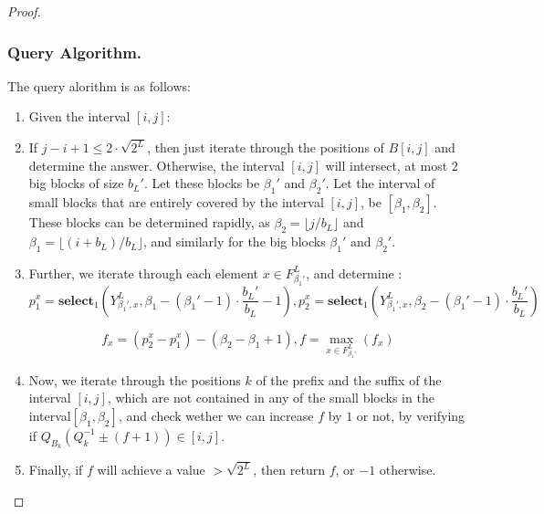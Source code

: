 \documentclass[runningheads]{llncs}
\begin{document}
\begin{proof}
    \subsubsection{Query Algorithm.} The query alorithm is as follows:

        \begin{enumerate}
            \item[] Given the interval $[i,j]$:
            
            \item If $j-i+1\leq 2\cdot \sqrt{2^L}$, then just iterate through the positions of $B[i,j]$ and determine the answer. 
            Otherwise, the interval $[i,j]$ will intersect, at most $2$ big blocks of size $b_L'$. Let these blocks be $\beta_1'$ and $\beta_2'$. 
            Let the interval of small blocks that are entirely covered by the interval $[i,j]$, be $[\beta_1, \beta_2]$. 
            These blocks can be determined rapidly, as $\beta_2=\lfloor j/b_L \rfloor$ and $\beta_1=\lfloor (i+b_L)/b_L \rfloor$, and similarly 
            for the big blocks $\beta_1'$ and $\beta_2'$.
            
            \item Further, we iterate through each element $x\in F_{\beta_1'}^L$, and determine :
            \[
                p_1^x = \textbf{select}_1( Y_{\beta_1',x}^L, \beta_1-(\beta_1'-1)\cdot \frac{b_L'}{b_L}-1 ) , 
                p_2^x = \textbf{select}_1( Y_{\beta_1',x}^L, \beta_2-(\beta_1'-1)\cdot \frac{b_L'}{b_L} ) 
            \]

            \[
                f_x=(p^x_2-p^x_1)-(\beta_2-\beta_1+1), f=\max_{x \in F_{\beta_1'}^L }( f_x )
            \]  
            
            \item Now, we iterate through the positions $k$ of the prefix and the suffix of the interval $[i,j]$, which are not contained in any of the 
            small blocks in the interval$[\beta_1, \beta_2]$, and check wether we can increase $f$ by $1$ or not, by verifying if $Q_{B_k}(Q^{-1}_k \pm (f+1) ) \in [i,j]$.
            
            \item Finally, if $f$ will achieve a value $>\sqrt{2^L}$, then return $f$, or $-1$ otherwise.

        \end{enumerate}
        

\end{proof}
\end{document}
